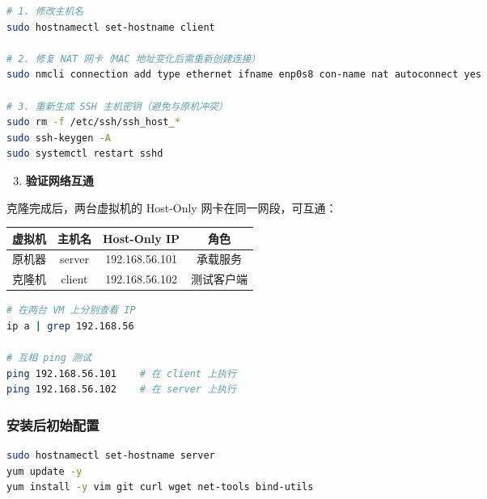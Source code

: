 \documentclass[12pt,a4paper]{ctexart}
\begin{document}
\begin{cmdbox}
\small
\begin{lstlisting}[language=bash,numbers=none]
# 1. 修改主机名
sudo hostnamectl set-hostname client

# 2. 修复 NAT 网卡（MAC 地址变化后需重新创建连接）
sudo nmcli connection add type ethernet ifname enp0s8 con-name nat autoconnect yes

# 3. 重新生成 SSH 主机密钥（避免与原机冲突）
sudo rm -f /etc/ssh/ssh_host_*
sudo ssh-keygen -A
sudo systemctl restart sshd
\end{lstlisting}
\end{cmdbox}

\begin{enumerate}[label=\arabic*.,leftmargin=*]
  \setcounter{enumi}{2}
  \item \textbf{验证网络互通}
\end{enumerate}

克隆完成后，两台虚拟机的 Host-Only 网卡在同一网段，可互通：

\begin{center}
\begin{tabular}{lccc}
\toprule
虚拟机 & 主机名 & Host-Only IP & 角色 \\
\midrule
原机器 & server & 192.168.56.101 & 承载服务 \\
克隆机 & client & 192.168.56.102 & 测试客户端 \\
\bottomrule
\end{tabular}
\end{center}

\begin{cmdbox}
\small
\begin{lstlisting}[language=bash,numbers=none]
# 在两台 VM 上分别查看 IP
ip a | grep 192.168.56

# 互相 ping 测试
ping 192.168.56.101    # 在 client 上执行
ping 192.168.56.102    # 在 server 上执行
\end{lstlisting}
\end{cmdbox}

\subsubsection{安装后初始配置}

\begin{cmdbox}
\small
\begin{lstlisting}[language=bash,numbers=none]
sudo hostnamectl set-hostname server
yum update -y
yum install -y vim git curl wget net-tools bind-utils
\end{lstlisting}
\end{cmdbox}
\end{document}
